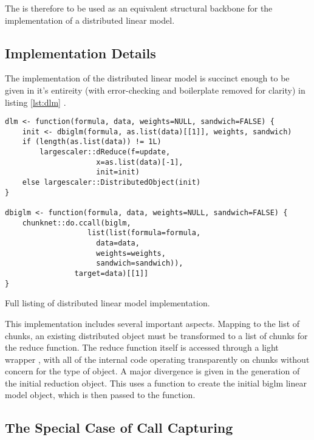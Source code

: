 The  is therefore to be used as an equivalent structural backbone for the implementation of a distributed linear model.

\subsection{Implementation Details}

The implementation of the distributed linear model is succinct enough to be given in it's entireity (with error-checking and boilerplate removed for clarity) in listing \ref{lst:dlm} .

\begin{listing}
	\begin{verbatim}
dlm <- function(formula, data, weights=NULL, sandwich=FALSE) {
	init <- dbiglm(formula, as.list(data)[[1]], weights, sandwich)
	if (length(as.list(data)) != 1L)
		largescaler::dReduce(f=update,
				     x=as.list(data)[-1],
				     init=init)
	else largescaler::DistributedObject(init)
}

dbiglm <- function(formula, data, weights=NULL, sandwich=FALSE) {
	chunknet::do.ccall(biglm,
		           list(list(formula=formula,
				     data=data,
				     weights=weights,
				     sandwich=sandwich)),
			    target=data)[[1]]
}
\end{verbatim}
\caption{Full listing of distributed linear model implementation.}
\label{lst:dlm}
\end{listing}

This implementation includes several important aspects.
Mapping to the list of chunks, an existing distributed object must be transformed to a list of chunks for the reduce function.
The reduce function itself is accessed through a light wrapper , with all of the internal code operating transparently on chunks without concern for the type of object.
A major divergence is given in the generation of the initial reduction object.
This uses a  function to create the initial biglm linear model object, which is then passed to the  function.

\subsection{The Special Case of Call Capturing}


